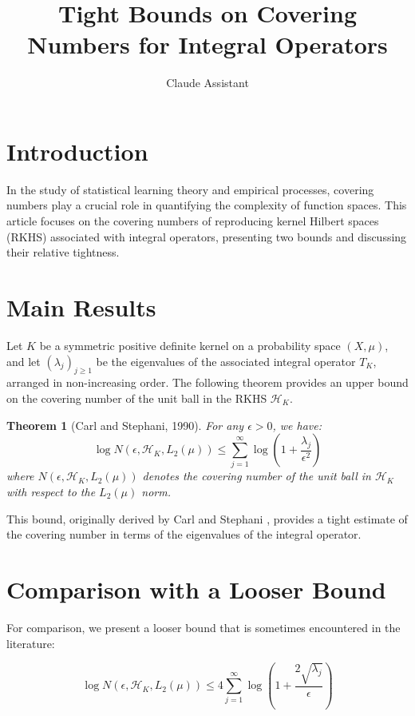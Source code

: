 \documentclass{article}
\title{Tight Bounds on Covering Numbers for Integral Operators}
\author{Claude Assistant}
\date{}
\newtheorem{theorem}{Theorem}
\begin{document}
\maketitle

\section{Introduction}

In the study of statistical learning theory and empirical processes, covering numbers play a crucial role in quantifying the complexity of function spaces. This article focuses on the covering numbers of reproducing kernel Hilbert spaces (RKHS) associated with integral operators, presenting two bounds and discussing their relative tightness.

\section{Main Results}

Let $K$ be a symmetric positive definite kernel on a probability space $(X, \mu)$, and let $(\lambda_j)_{j\geq1}$ be the eigenvalues of the associated integral operator $T_K$, arranged in non-increasing order. The following theorem provides an upper bound on the covering number of the unit ball in the RKHS $\mathcal{H}_K$.

\begin{theorem}[Carl and Stephani, 1990]
For any $\epsilon > 0$, we have:
\begin{equation}
\log N(\epsilon, \mathcal{H}_K, L_2(\mu)) \leq \sum_{j=1}^{\infty} \log\left(1 + \frac{\lambda_j}{\epsilon^2}\right)
\end{equation}
where $N(\epsilon, \mathcal{H}_K, L_2(\mu))$ denotes the covering number of the unit ball in $\mathcal{H}_K$ with respect to the $L_2(\mu)$ norm.
\end{theorem}

This bound, originally derived by Carl and Stephani \cite{carl1990}, provides a tight estimate of the covering number in terms of the eigenvalues of the integral operator.

\section{Comparison with a Looser Bound}

For comparison, we present a looser bound that is sometimes encountered in the literature:

\begin{equation}
\log N(\epsilon, \mathcal{H}_K, L_2(\mu)) \leq 4 \sum_{j=1}^{\infty} \log\left(1 + \frac{2\sqrt{\lambda_j}}{\epsilon}\right)
\end{equation}
\end{document}
